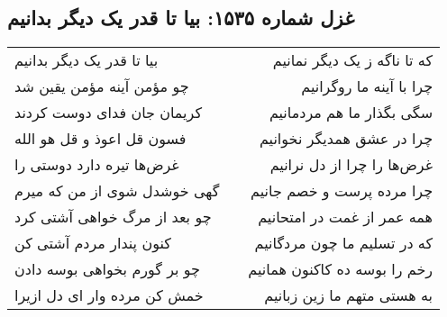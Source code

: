 \begin{center}
\section*{غزل شماره ۱۵۳۵: بیا تا قدر یک دیگر بدانیم}
\label{sec:1535}
\begin{longtable}{l p{0.5cm} r}
بیا تا قدر یک دیگر بدانیم
&&
که تا ناگه ز یک دیگر نمانیم
\\
چو مؤمن آینه مؤمن یقین شد
&&
چرا با آینه ما روگرانیم
\\
کریمان جان فدای دوست کردند
&&
سگی بگذار ما هم مردمانیم
\\
فسون قل اعوذ و قل هو الله
&&
چرا در عشق همدیگر نخوانیم
\\
غرض‌ها تیره دارد دوستی را
&&
غرض‌ها را چرا از دل نرانیم
\\
گهی خوشدل شوی از من که میرم
&&
چرا مرده پرست و خصم جانیم
\\
چو بعد از مرگ خواهی آشتی کرد
&&
همه عمر از غمت در امتحانیم
\\
کنون پندار مردم آشتی کن
&&
که در تسلیم ما چون مردگانیم
\\
چو بر گورم بخواهی بوسه دادن
&&
رخم را بوسه ده کاکنون همانیم
\\
خمش کن مرده وار ای دل ازیرا
&&
به هستی متهم ما زین زبانیم
\\
\end{longtable}
\end{center}
